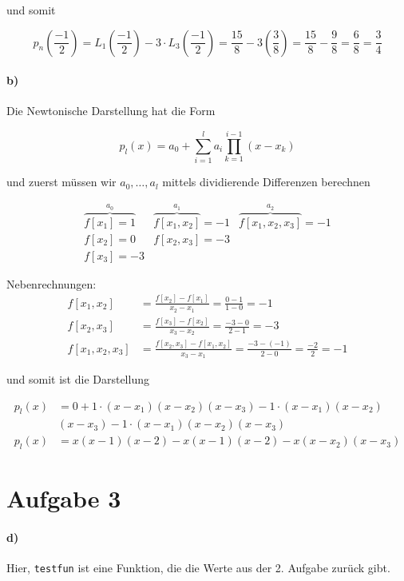 \documentclass[a4paper,ngerman]{scrartcl}
\begin{document}
und somit

\[
p_n\left(\frac{-1}{2}\right) = L_1\left(\frac{-1}{2}\right) - 3 \cdot
L_3\left(\frac{-1}{2}\right) = \frac{15}{8} -
3\left(\frac{3}{8}\right) = \frac{15}{8} - \frac{9}{8} = \frac{6}{8} =
\frac{3}{4}
\]

\paragraph{b)}
Die Newtonische Darstellung hat die Form

\[
p_l(x) = a_0 + \sum^l_{i = 1} a_i \prod^{i-1}_{k = 1} (x-x_k)
\]

und zuerst müssen wir $a_0,\dots,a_l$ mittels dividierende Differenzen
berechnen

\[
\begin{array}{lll}
  \overbrace{f[x_1] = 1}^{a_0} & \overbrace{f[x_1,x_2]}^{a_1} = -1 & \overbrace{f[x_1,x_2,x_3]}^{a_2} = -1\\
  f[x_2] = 0 & f[x_2,x_3] = -3\\
  f[x_3] = -3
\end{array}
\]

Nebenrechnungen:
\begin{align*}
  f[x_1,x_2] &= \frac{f[x_2] - f[x_1]}{x_2 - x_1} = \frac{0 - 1}{1 - 0} = -1\\
  f[x_2,x_3] &= \frac{f[x_3] - f[x_2]}{x_3 - x_2} = \frac{-3 - 0}{2 - 1} = -3\\
  f[x_1,x_2,x_3] &= \frac{f[x_2,x_3] - f[x_1,x_2]}{x_3 - x_1} =
  \frac{-3 - (-1)}{2 - 0} = \frac{-2}{2} = -1
\end{align*}

und somit ist die Darstellung

\begin{align*}
  p_l(x) &= 0 + 1\cdot (x-x_1)(x-x_2)(x-x_3) - 1 \cdot (x-x_1) (x-x_2)\\
  & (x-x_3) -1\cdot (x-x_1)(x-x_2)(x-x_3)\\
  p_l(x) &= x(x-1)(x-2) - x(x-1)(x-2) - x(x-x_2)(x-x_3)
\end{align*}

\section*{Aufgabe 3}

\paragraph{d)}

Hier, \texttt{testfun} ist eine Funktion, die die Werte aus der
2. Aufgabe zurück gibt.


\end{document}

